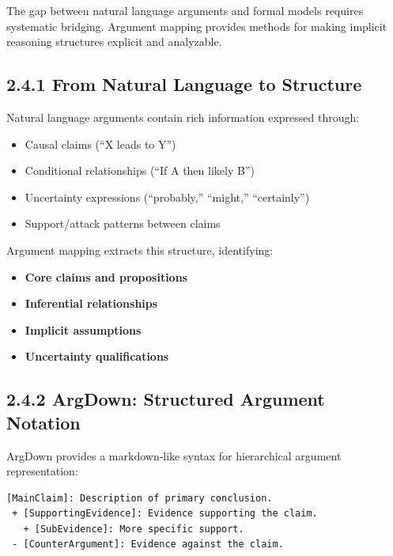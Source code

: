 \documentclass[
  11pt,
  letterpaper,
]{book}
\providecommand{\tightlist}{%
  \setlength{\itemsep}{0pt}\setlength{\parskip}{0pt}}
\begin{document}

The gap between natural language arguments and formal models requires
systematic bridging. Argument mapping provides methods for making
implicit reasoning structures explicit and analyzable.

\subsection*{2.4.1 From Natural Language to
Structure}\label{sec-natural-to-structure}

Natural language arguments contain rich information expressed through:

\begin{itemize}
\tightlist
\item
  Causal claims (``X leads to Y'')
\item
  Conditional relationships (``If A then likely B'')
\item
  Uncertainty expressions (``probably,'' ``might,'' ``certainly'')
\item
  Support/attack patterns between claims
\end{itemize}

Argument mapping extracts this structure, identifying:

\begin{itemize}
\tightlist
\item
  \textbf{Core claims and propositions}
\item
  \textbf{Inferential relationships}
\item
  \textbf{Implicit assumptions}
\item
  \textbf{Uncertainty qualifications}
\end{itemize}

\subsection*{2.4.2 ArgDown: Structured Argument
Notation}\label{sec-argdown-notation}

ArgDown provides a markdown-like syntax for hierarchical argument
representation:

\begin{verbatim}
[MainClaim]: Description of primary conclusion.
 + [SupportingEvidence]: Evidence supporting the claim.
   + [SubEvidence]: More specific support.
 - [CounterArgument]: Evidence against the claim.
\end{verbatim}
\end{document}
